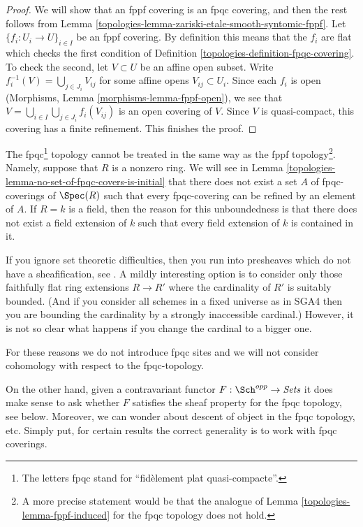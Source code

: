 \begin{proof}

We will show that an fppf covering is an fpqc covering, and then the
rest follows from
Lemma \ref{topologies-lemma-zariski-etale-smooth-syntomic-fppf}.
Let $\{f_i : U_i \to U\}_{i \in I}$ be an fppf covering.
By definition this means that the $f_i$ are flat which checks the first
condition of Definition \ref{topologies-definition-fpqc-covering}. To check the
second, let $V \subset U$ be an affine open subset.
Write $f_i^{-1}(V) = \bigcup_{j \in J_i} V_{ij}$
for some affine opens $V_{ij} \subset U_i$. Since each $f_i$ is open
(Morphisms, Lemma \ref{morphisms-lemma-fppf-open}), we see that
$V = \bigcup_{i\in I} \bigcup_{j \in J_i} f_i(V_{ij})$
is an open covering of $V$.
Since $V$ is quasi-compact, this covering has a finite
refinement. This finishes the proof.
\end{proof}

The fpqc\footnote{The letters fpqc stand for
``fid\`element plat quasi-compacte''.}
topology cannot be treated in the same way as the fppf
topology\footnote{A more precise statement would be that the analogue of
Lemma \ref{topologies-lemma-fppf-induced} for the fpqc topology does not hold.}.
Namely, suppose that $R$ is a nonzero ring. We will see in
Lemma \ref{topologies-lemma-no-set-of-fpqc-covers-is-initial}
that there does not exist a set $A$ of fpqc-coverings of $\Spec(R)$
such that every fpqc-covering can be refined by an element of $A$.
If $R = k$ is a field, then the reason for this unboundedness is that
there does not exist a field extension of $k$ such that every field extension
of $k$ is contained in it.

\medskip\noindent
If you ignore set theoretic difficulties, then you run into presheaves
which do not have a sheafification, see
\cite[Theorem 5.5]{Waterhouse-fpqc-sheafification}.
A mildly interesting option is to consider only those faithfully flat ring
extensions $R \to R'$ where the cardinality of $R'$ is suitably bounded.
(And if you consider all schemes in a fixed universe as in SGA4 then you
are bounding the cardinality by a strongly inaccessible cardinal.)
However, it is not so clear what happens if you change the cardinal
to a bigger one.

\medskip\noindent
For these reasons we do not introduce fpqc sites and we will not consider
cohomology with respect to the fpqc-topology.

\medskip\noindent
On the other hand, given a contravariant functor
$F : \Sch^{opp} \to \textit{Sets}$
it does make sense to ask whether $F$ satisfies the sheaf property
for the fpqc topology, see below.
Moreover, we can wonder about descent of object
in the fpqc topology, etc. Simply put, for certain results the correct
generality is to work with fpqc coverings.

